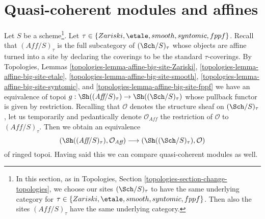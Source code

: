 \section{Quasi-coherent modules and affines}
\label{section-alternative-quasi-coherent}

\noindent
Let $S$ be a scheme\footnote{In this section, as in
Topologies, Section \ref{topologies-section-change-topologies},
we choose our sites $(\Sch/S)_\tau$ to have the same underlying category
for $\tau \in \{Zariski, \etale, smooth, syntomic, fppf\}$. Then also
the sites $(\textit{Aff}/S)_\tau$ have the same underlying category.}.
Let $\tau \in \{Zariski, \etale, smooth, syntomic, fppf\}$.
Recall that $(\textit{Aff}/S)_\tau$ is the full subcategory
of $(\Sch/S)_\tau$ whose objects are affine turned into
a site by declaring the coverings to be the standard $\tau$-coverings.
By Topologies, Lemmas
\ref{topologies-lemma-affine-big-site-Zariski},
\ref{topologies-lemma-affine-big-site-etale},
\ref{topologies-lemma-affine-big-site-smooth},
\ref{topologies-lemma-affine-big-site-syntomic}, and
\ref{topologies-lemma-affine-big-site-fppf}
we have an equivalence of topoi
$g : \Sh((\textit{Aff}/S)_\tau) \to \Sh((\Sch/S)_\tau)$
whose pullback functor is given by restriction.
Recalling that $\mathcal{O}$ denotes the structure sheaf on
$(\Sch/S)_\tau$, let us temporarily and pedantically
denote $\mathcal{O}_{\textit{Aff}}$
the restriction of $\mathcal{O}$ to $(\textit{Aff}/S)_\tau$.
Then we obtain an equivalence
\begin{equation}
\label{equation-alternative-ringed}
(\Sh((\textit{Aff}/S)_\tau), \mathcal{O}_{\textit{Aff}})
\longrightarrow
(\Sh((\Sch/S)_\tau), \mathcal{O})
\end{equation}
of ringed topoi. Having said this we can compare quasi-coherent modules
as well.

